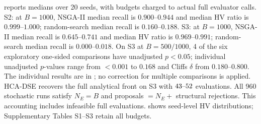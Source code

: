 %
\RefBaselinesTab{} reports medians over 20 seeds, with budgets charged to actual full evaluator calls. S2: at $B=1000$, NSGA-II median recall is $0.900\text{--}0.944$ and median HV ratio is $0.999\text{--}1.000$; random-search median recall is $0.160\text{--}0.188$.
S3: at $B=1000$, NSGA-II median recall is $0.645\text{--}0.741$ and median HV ratio is $0.969\text{--}0.991$; random-search median recall is $0.000\text{--}0.018$.
On S3 at $B=500/1000$, 4 of the six exploratory one-sided comparisons have unadjusted $p<0.05$; individual unadjusted $p$-values range from $<0.001$ to $0.168$ and Cliff\textquotesingle{}s $\delta$ from $0.180\text{--}0.800$. The individual results are in \RefStatsTab{}; no correction for multiple comparisons is applied. HCA-DSE recovers the full analytical front on S3 with $43\text{--}52$ evaluations.
All 960 stochastic runs satisfy $N_E=B$ and proposals $=N_E+$ structural rejections.
This accounting includes infeasible full evaluations. \RefHvFig{} shows
seed-level HV distributions; Supplementary Tables S1--S3 retain all budgets.
